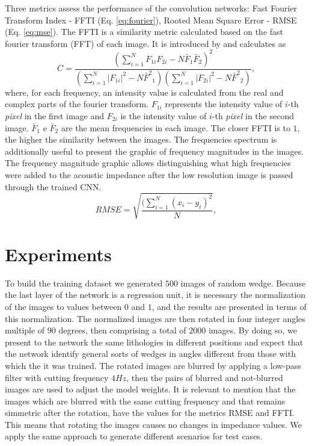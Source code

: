 \documentclass[conference,compsoc]{IEEEtran}
\begin{document}
Three metrics assess the performance of the convolution networks: Fast Fourier Transform Index - FFTI (Eq. \ref{eq:fourier}),
Rooted Mean Square Error - RMSE (Eq. \ref{eq:mse}). 
The FFTI is a similarity metric calculated based on the fast fourier transform (FFT) of each image.
It is introduced by \cite{naranyana} and calculates as 
\begin{equation}
 C = \frac{ (\sum_{i=1}^{N}{F_{1i}F_{2i}} - N \bar{F}_1\bar{F}_2 )^2 }{ (\sum_{i=1}^{N}{|F_{1i}|^2} - N{\bar{F}^2}_1)( \sum_{i=1}^{N}{|F_{2i}|^2} - N{\bar{F}^2}_2 )},
 \label{eq:fourier}
\end{equation}
where, for each frequency, an intensity value is calculated from the real and complex parts of the fourier
transform. $F_{1i}$ represents the intensity value of $i$-th \textit{pixel} in the first image and $F_{2i}$
is the intensity value of $i$-th \textit{pixel} in the second image. $\bar{F}_1$ e $\bar{F}_2$ are the mean
frequencies in each image. The closer FFTI is to $1$, the higher the similarity between the images.
The frequencies spectrum is additionally useful to present the graphic of frequency magnitudes in the images.
The frequency magnitude graphic allows distinguishing what high frequencies were added to the acoustic impedance
after the low resolution image is passed through the trained CNN. 
\begin{equation}
 RMSE = \sqrt{\frac{ (\sum_{i=1}^{N}{(x_i -y_i)^2 } }{N}},
 \label{eq:mse}
\end{equation}

\section{Experiments}
To build the training dataset we generated $500$ images of random wedge.
Because the last layer of the network is a regression unit, it is necessary the
normalization of the images to values between $0$ and $1$, and the results
are presented in terms of this normalization.
The normalized images are then rotated in four integer angles multiple of $90$
degrees, then comprising a total of $2000$ images. By doing so, we present to the network the same lithologies in different positions and expect that the network
identify general sorts of wedges in angles different from those with which the it was trained.
The rotated images are blurred by applying a low-pass filter with
cutting frequency $4Hz$, then the pairs of blurred and not-blurred images are used to
adjust the model weights. It is relevant to mention that the images which are blurred with the same cutting frequency and that remains simmetric after the rotation,
have the values for the metrics RMSE and FFTI. This means that rotating the images causes no changes in impedance values.
We apply the same approach to generate different scenarios for test cases.
\end{document}
